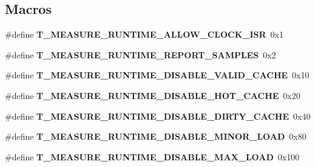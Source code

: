 \subsection*{Macros}
\begin{DoxyCompactItemize}
\item 
\mbox{\label{group__RTEMSTestFrameworkMeasureRuntime_ga16e76cffb3fac46ef96e5b052d576497}} 
\#define {\bfseries T\+\_\+\+M\+E\+A\+S\+U\+R\+E\+\_\+\+R\+U\+N\+T\+I\+M\+E\+\_\+\+A\+L\+L\+O\+W\+\_\+\+C\+L\+O\+C\+K\+\_\+\+I\+SR}~0x1
\item 
\mbox{\label{group__RTEMSTestFrameworkMeasureRuntime_gad383cedff0c54106502af676298661a8}} 
\#define {\bfseries T\+\_\+\+M\+E\+A\+S\+U\+R\+E\+\_\+\+R\+U\+N\+T\+I\+M\+E\+\_\+\+R\+E\+P\+O\+R\+T\+\_\+\+S\+A\+M\+P\+L\+ES}~0x2
\item 
\mbox{\label{group__RTEMSTestFrameworkMeasureRuntime_gaf874ef9838ac590fc464181cc074edb9}} 
\#define {\bfseries T\+\_\+\+M\+E\+A\+S\+U\+R\+E\+\_\+\+R\+U\+N\+T\+I\+M\+E\+\_\+\+D\+I\+S\+A\+B\+L\+E\+\_\+\+V\+A\+L\+I\+D\+\_\+\+C\+A\+C\+HE}~0x10
\item 
\mbox{\label{group__RTEMSTestFrameworkMeasureRuntime_ga211d25d9838b49dd469ff161847a24ea}} 
\#define {\bfseries T\+\_\+\+M\+E\+A\+S\+U\+R\+E\+\_\+\+R\+U\+N\+T\+I\+M\+E\+\_\+\+D\+I\+S\+A\+B\+L\+E\+\_\+\+H\+O\+T\+\_\+\+C\+A\+C\+HE}~0x20
\item 
\mbox{\label{group__RTEMSTestFrameworkMeasureRuntime_ga83cb3c1b533cdfdc85400a5f548164e3}} 
\#define {\bfseries T\+\_\+\+M\+E\+A\+S\+U\+R\+E\+\_\+\+R\+U\+N\+T\+I\+M\+E\+\_\+\+D\+I\+S\+A\+B\+L\+E\+\_\+\+D\+I\+R\+T\+Y\+\_\+\+C\+A\+C\+HE}~0x40
\item 
\mbox{\label{group__RTEMSTestFrameworkMeasureRuntime_ga16b1c942cf75e84131735ed09dec5b12}} 
\#define {\bfseries T\+\_\+\+M\+E\+A\+S\+U\+R\+E\+\_\+\+R\+U\+N\+T\+I\+M\+E\+\_\+\+D\+I\+S\+A\+B\+L\+E\+\_\+\+M\+I\+N\+O\+R\+\_\+\+L\+O\+AD}~0x80
\item 
\mbox{\label{group__RTEMSTestFrameworkMeasureRuntime_ga4fb15fe1852a38cf78db4e4a2cf6b7b7}} 
\#define {\bfseries T\+\_\+\+M\+E\+A\+S\+U\+R\+E\+\_\+\+R\+U\+N\+T\+I\+M\+E\+\_\+\+D\+I\+S\+A\+B\+L\+E\+\_\+\+M\+A\+X\+\_\+\+L\+O\+AD}~0x100
\end{DoxyCompactItemize}
